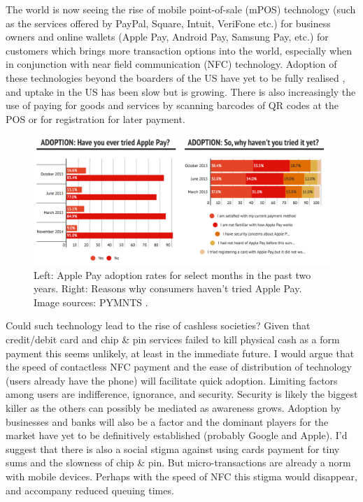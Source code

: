\documentclass[paper=a4, fontsize=12pt]{scrartcl}	%
\numberwithin{equation}{section}															%
\numberwithin{figure}{section}																%
\numberwithin{table}{section}
\begin{document}
The world is now seeing the rise of mobile point-of-sale (mPOS) technology (such as the services offered by PayPal, Square, Intuit, VeriFone etc.) for business owners and online wallets (Apple Pay, Android Pay, Samsung Pay, etc.) for customers which brings more transaction options into the world, especially when in conjunction with near field communication (NFC) technology. Adoption of these technologies beyond the boarders of the US have yet to be fully realised \cite{bbc2016google, android2016google, today2015apple}, and uptake in the US has been slow \cite{nfcworld2015trustev, pymnts2015apple} but is growing. There is also increasingly the use of paying for goods and services by scanning barcodes of QR codes at the POS or for registration for later payment. 


\begin{figure}[H]
    \centering
    
    \includegraphics[width=\textwidth]{img/applepay1.png}    
    \caption{Left: Apple Pay adoption rates for select months in the past two years. Right: Reasons why consumers haven't tried Apple Pay. Image sources: PYMNTS \cite{pymnts2015apple}.}
    
    \label{fig:mobile-commerce}
\end{figure}


Could such technology lead to the rise of cashless societies? Given that credit/debit card and chip \& pin services failed to kill physical cash as a form payment this seems unlikely, at least in the immediate future. I would argue that the speed of contactless NFC payment and the ease of distribution of technology (users already have the phone) will facilitate quick adoption. Limiting factors among users are indifference, ignorance, and security. Security is likely the biggest killer as the others can possibly be mediated as awareness grows. Adoption by businesses and banks will also be a factor and the dominant players for the market have yet to be definitively established (probably Google and Apple). I'd suggest that there is also a social stigma against using cards payment for tiny sums and the slowness of chip \& pin. But micro-transactions are already a norm with mobile devices. Perhaps with the speed of NFC this stigma would disappear, and accompany reduced queuing times. 
\end{document}
